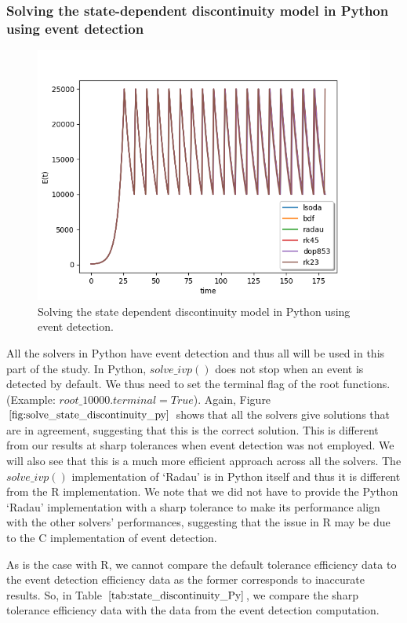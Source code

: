 \subsubsection{Solving the state-dependent discontinuity model in Python using event detection}
\begin{figure}[H]
\centering
\includegraphics[width=0.7\linewidth]{./figures/solve_state_discontinuity_py}
\caption{Solving the state dependent discontinuity model in Python using event detection.}
\label{fig:solve_state_discontinuity_py}
\end{figure}
All the solvers in Python have event detection and thus all will be used in this part of the study. In Python, $solve\_ivp()$ does not stop when an event is detected by default. We thus need to set the terminal flag of the root functions.
(Example: $root\_10000.terminal = True$).
Again, Figure $\ref{fig:solve_state_discontinuity_py}$ shows that all the solvers give solutions that are in agreement, suggesting that this is the correct solution. This is different from our results at sharp tolerances when event detection was not employed. We will also see that this is a much more efficient approach across all the solvers. The $solve\_ivp()$ implementation of `Radau' is in Python itself and thus it is different from the R implementation. We note that we did not have to provide the Python `Radau' implementation with a sharp tolerance to make its performance align with the other solvers' performances, suggesting that the issue in R may be due to the C implementation of event detection.

As is the case with R, we cannot compare the default tolerance efficiency data to the event detection efficiency data as the former corresponds to inaccurate results. So, in Table $\ref{tab:state_discontinuity_Py}$, we compare the sharp tolerance efficiency data with the data from the event detection computation.

